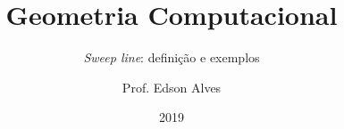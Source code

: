 \title{Geometria Computacional}
\subtitle{\textit{Sweep line}: definição e exemplos} 
\date{2019}
\author{Prof. Edson Alves}
